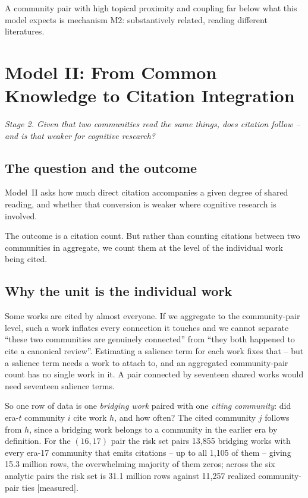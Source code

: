 \documentclass[11pt]{article}
\newcommand{\seccap}[1]{{\slshape\small #1\par}\vspace{0.8em}}
\newcommand{\meas}{{\footnotesize\textsf{[measured]}}}
\begin{document}
A community pair with high topical proximity and coupling far below what this model expects
is mechanism M2: substantively related, reading different literatures.

\section{Model II: From Common Knowledge to Citation Integration}
\label{sec:modelII}
\seccap{Stage 2. Given that two communities read the same things, does citation follow --
and is that weaker for cognitive research?}

\subsection{The question and the outcome}

Model~II asks how much direct citation accompanies a given degree of shared reading, and
whether that conversion is weaker where cognitive research is involved.

The outcome is a citation count. But rather than counting citations between two communities
in aggregate, we count them at the level of the individual work being cited.

\subsection{Why the unit is the individual work}

Some works are cited by almost everyone. If we aggregate to the community-pair level, such a
work inflates every connection it touches and we cannot separate ``these two communities are
genuinely connected'' from ``they both happened to cite a canonical review''. Estimating a
salience term for each work fixes that -- but a salience term needs a work to attach to,
and an aggregated community-pair count has no single work in it. A pair connected by
seventeen shared works would need seventeen salience terms.

So one row of data is one \emph{bridging work} paired with one \emph{citing community}: did
era-$t$ community $i$ cite work $h$, and how often? The cited community $j$ follows from
$h$, since a bridging work belongs to a community in the earlier era by definition. For the
$(16,17)$ pair the risk set pairs 13{,}855 bridging works with every era-17 community that
emits citations -- up to all 1{,}105 of them -- giving 15.3 million rows, the overwhelming
majority of them zeros; across the six analytic pairs the risk set is 31.1 million rows
against 11{,}257 realized community-pair ties \meas{}.
\end{document}
